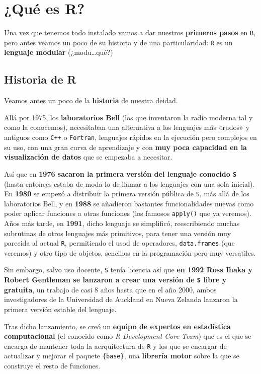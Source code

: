 \documentclass[11pt,]{book}
\begin{document}
\hypertarget{que-es-R}{%
\chapter{¿Qué es R?}\label{que-es-R}}

Una vez que tenemos todo instalado vamos a dar nuestros \textbf{primeros pasos} en \texttt{R}, pero antes veamos un poco de su historia y de una particularidad: \texttt{R} es un \textbf{lenguaje modular} (¿modu\ldots{}qué?)

\hypertarget{historia-de-r}{%
\section{Historia de R}\label{historia-de-r}}

Veamos antes un poco de la \textbf{historia} de nuestra deidad.

Allá por 1975, los \textbf{laboratorios Bell} (los que inventaron la radio moderna tal y como la conocemos), necesitaban una alternativa a los lenguajes más «rudos» y antiguos como \texttt{C++} o \texttt{Fortran}, lenguajes rápidos en la ejecución pero complejos en su uso, con una gran curva de aprendizaje y con \textbf{muy poca capacidad en la visualización de datos} que se empezaba a necesitar.

Así que en \textbf{1976 sacaron la primera versión del lenguaje conocido \texttt{S}} (hasta entonces estaba de moda lo de llamar a los lenguajes con una sola inicial). En \textbf{1980} se empezó a distribuir la primera versión pública de \texttt{S}, más allá de los laboratorios Bell, y en \textbf{1988} se añadieron bastantes funcionalidades nuevas como poder aplicar funciones a otras funciones (los famosos \texttt{apply()} que ya veremos). Años más tarde, en \textbf{1991}, dicho lenguaje se simplificó, reescribiendo muchas subrutinas de otros lenguajes más primitivos, para tener una versión muy parecida al actual \texttt{R}, permitiendo el usod de operadores, \texttt{data.frames} (que veremos) y otro tipo de objetos, sencillos en la programación pero muy versatiles.

Sin embargo, salvo uso docente, \texttt{S} tenía licencia así que \textbf{en 1992 Ross Ihaka y Robert Gentleman se lanzaron a crear una versión de \texttt{S} libre y gratuita}, un trabajo de casi 8 años hasta que en el año 2000, ambos investigadores de la Universidad de Auckland en Nueva Zelanda lanzaron la primera versión estable del lenguaje.

Tras dicho lanzamiento, se creó un \textbf{equipo de expertos en estadística computacional} (el conocido como \emph{R Development Core Team}) que es el que se encarga de mantener toda la aerquitectura de \texttt{R} y los que se encargar de actualizar y mejorar el paquete \texttt{\{base\}}, una \textbf{librería motor} sobre la que se construye el resto de funciones.
\end{document}

